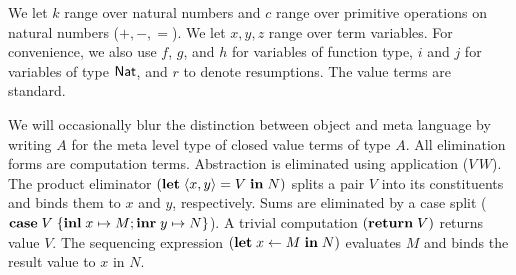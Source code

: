 \documentclass[12pt,phd,lfcs,twoside,openright,logo,leftchapter,normalheadings]{infthesis}
\theoremstyle{plain}
\theoremstyle{definition}
\begin{document}
We let $k$ range over natural numbers and $c$ range over primitive
operations on natural numbers ($+, -, =$).
%
We let $x, y, z$ range over term variables.
%
For convenience, we also use $f$, $g$, and $h$ for variables of
function type, $i$ and $j$ for variables of type $\mathsf{Nat}$, and $r$ to
denote resumptions.
%
The value terms are standard.

%
We will occasionally blur the distinction between object and meta
language by writing $A$ for the meta level type of closed value terms
of type $A$.
%
All elimination forms are computation terms. Abstraction is eliminated
using application ($V\,W$).
%
The product eliminator $(\mathbf{let} \; \langle x,y \rangle = V \; \mathbf{in} \; N)$ splits
a pair $V$ into its constituents and binds them to $x$ and $y$,
respectively. Sums are eliminated by a case split ($\mathbf{case}\; V\;
\{\mathbf{inl}\; x \mapsto M; \mathbf{inr}\; y \mapsto N\}$).
%
A trivial computation $(\mathbf{return}\;V)$ returns value $V$. The sequencing
expression $(\mathbf{let} \; x \leftarrow M \; \mathbf{in} \; N)$ evaluates $M$ and binds
the result value to $x$ in $N$.
\end{document}
